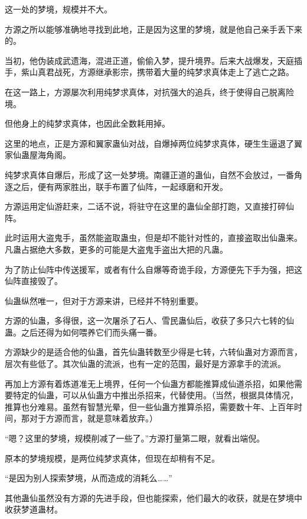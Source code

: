 
\begin{this_body}

这一处的梦境，规模并不大。

方源之所以能够准确地寻找到此地，正是因为这里的梦境，就是他自己亲手丢下来的。

当初，他伪装成武遗海，混进正道，偷偷入梦，提升境界。后来大战爆发，天庭插手，紫山真君战死，方源继承影宗，携带着大量的纯梦求真体走上了逃亡之路。

在这一路上，方源屡次利用纯梦求真体，对抗强大的追兵，终于使得自己脱离险境。

但他身上的纯梦求真体，也因此全数耗用掉。

这里的地点，正是方源和翼家蛊仙对战，自爆掉两位纯梦求真体，硬生生逼退了翼家仙蛊屋海角阁。

纯梦求真体自爆后，形成了这一处梦境。南疆正道的蛊仙，自然不会放过，一番角逐之后，便有两家胜出，联手布置了仙阵，一起琢磨和开发。

方源运用定仙游赶来，二话不说，将驻守在这里的蛊仙全部打跑，又直接打碎仙阵。

此时运用大盗鬼手，虽然能盗取蛊虫，但是却不能针对性的，直接盗取出仙蛊来。凡蛊占据绝大多数，更多的可能是大盗鬼手盗出大把的凡蛊。

为了防止仙阵中传送援军，或者有什么自爆等奇诡手段，方源便先下手为强，把这仙阵直接毁了。

仙蛊纵然唯一，但对于方源来讲，已经并不特别重要。

方源的仙蛊，多得很，这一次屠杀了石人、雪民蛊仙后，收获了多只六七转的仙蛊。之后还得为如何喂养它们而头痛一番。

方源缺少的是适合他的仙蛊，首先仙蛊转数至少得是七转，六转仙蛊对方源而言，层次有些低了。其次仙蛊的流派，也有一定的范围，最好是方源拿手的流派。

再加上方源有着炼道准无上境界，任何一个仙蛊方都能推算成仙道杀招，如果他需要特定的仙蛊，可以从仙蛊方中推出杀招来，代替使用。（当然，根据具体情况，推算也分难易。虽然有智慧光晕，但一些仙蛊方推算杀招，需要数十年、上百年时间，那对于方源而言，就是意味着放弃。）

“嗯？这里的梦境，规模削减了一些了。”方源打量第二眼，就看出端倪。

原本的梦境规模，是两位纯梦求真体，但现在却稍有不足。

“是因为别人探索梦境，从而造成的消耗么……”

其他蛊仙虽然没有方源的先进手段，但也能探索，他们最大的收获，就是在梦境中收获梦道蛊材。


\end{this_body}
